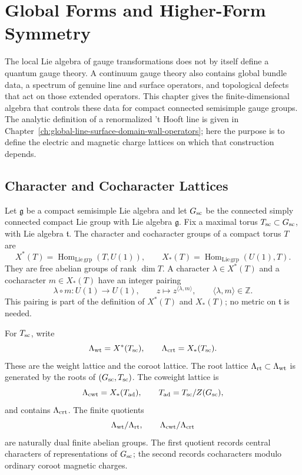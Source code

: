 \chapter{Global Forms and Higher-Form Symmetry}
\label{ch:global-forms-higher-form-symmetry}

\ConventionsMixed

The local Lie algebra of gauge transformations does not by itself define a
quantum gauge theory.  A continuum gauge theory also contains global bundle
data, a spectrum of genuine line and surface operators, and topological
defects that act on those extended operators.  This chapter gives the
finite-dimensional algebra that controls these data for compact connected
semisimple gauge groups.  The analytic definition of a renormalized
't Hooft line is given in
Chapter~\ref{ch:global-line-surface-domain-wall-operators}; here the purpose
is to define the electric and magnetic charge lattices on which that
construction depends.

\section{Character and Cocharacter Lattices}

Let \(\mathfrak g\) be a compact semisimple Lie algebra and let \(G_{\rm sc}\)
be the connected simply connected compact Lie group with Lie algebra
\(\mathfrak g\).  Fix a maximal torus \(T_{\rm sc}\subset G_{\rm sc}\), with
Lie algebra \(\mathfrak t\).  The character and cocharacter groups of a
compact torus \(T\) are
\[
  X^*(T)=\operatorname{Hom}_{\mathrm{Lie\,grp}}(T,U(1)),
  \qquad
  X_*(T)=\operatorname{Hom}_{\mathrm{Lie\,grp}}(U(1),T).
\]
They are free abelian groups of rank \(\dim T\).  A character
\(\lambda\in X^*(T)\) and a cocharacter \(m\in X_*(T)\) have an integer
pairing
\[
  \lambda\circ m:U(1)\longrightarrow U(1),
  \qquad
  z\longmapsto z^{\langle \lambda,m\rangle},
  \qquad
  \langle\lambda,m\rangle\in\mathbb Z .
\]
This pairing is part of the definition of \(X^*(T)\) and \(X_*(T)\); no
metric on \(\mathfrak t\) is needed.

For \(T_{\rm sc}\), write
\[
  \Lambda_{\rm wt}=X^*(T_{\rm sc}),\qquad
  \Lambda_{\rm crt}=X_*(T_{\rm sc}).
\]
These are the weight lattice and the coroot lattice.  The root lattice
\(\Lambda_{\rm rt}\subset\Lambda_{\rm wt}\) is generated by the roots of
\((G_{\rm sc},T_{\rm sc})\).  The coweight lattice is
\[
  \Lambda_{\rm cwt}=X_*(T_{\rm ad}),
  \qquad
  T_{\rm ad}=T_{\rm sc}/Z(G_{\rm sc}),
\]
and contains \(\Lambda_{\rm crt}\).  The finite quotients
\[
  \Lambda_{\rm wt}/\Lambda_{\rm rt},
  \qquad
  \Lambda_{\rm cwt}/\Lambda_{\rm crt}
\]
are naturally dual finite abelian groups.  The first quotient records
central characters of representations of \(G_{\rm sc}\); the second records
cocharacters modulo ordinary coroot magnetic charges.

